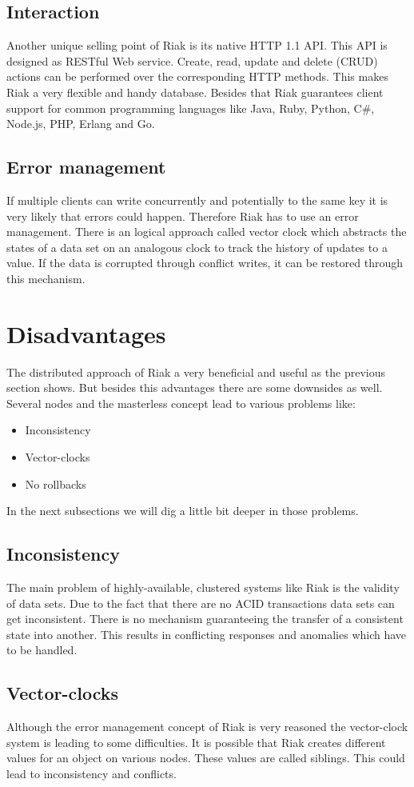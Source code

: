 \subsection{Interaction}
Another unique selling point of Riak is its native HTTP 1.1 API. This API is designed as RESTful Web service. Create, read, update and delete (CRUD) actions can be performed over the corresponding HTTP methods. This makes Riak a very flexible and handy database. 
Besides that Riak guarantees client support for common programming languages like Java, Ruby, Python, C\#, Node.js, PHP, Erlang and Go.  
\subsection{Error management}
If multiple clients can write concurrently and potentially to the same key it is very likely that errors could happen. Therefore Riak has to use an error management. There is an logical approach called vector clock which abstracts the states of a data set on an analogous clock to track the history of updates to a value. If the data is corrupted through conflict writes, it can be restored through this mechanism. 
\section{Disadvantages}
The distributed approach of Riak a very beneficial and useful as the previous section shows. But besides this advantages there are some downsides as well. Several nodes and the masterless concept lead to various problems like:
 \begin{itemize}
 	\item Inconsistency
 	\item Vector-clocks
 	\item No rollbacks
 \end{itemize}
 In the next subsections we will dig a little bit deeper in those problems. \cite{FHKoln.01.04.17}
 \subsection{Inconsistency}
 The main problem of highly-available, clustered systems like Riak is the validity of data sets. Due to the fact that there are no ACID transactions data sets can get inconsistent. There is no mechanism guaranteeing the transfer of a consistent state into another. This results in conflicting responses and anomalies which have to be handled.  
 \subsection{Vector-clocks}
 Although the error management concept of Riak is very reasoned the vector-clock system is leading to some difficulties. It is possible that Riak creates different values for an object on various nodes. These values are called siblings. This could lead to inconsistency and conflicts.
